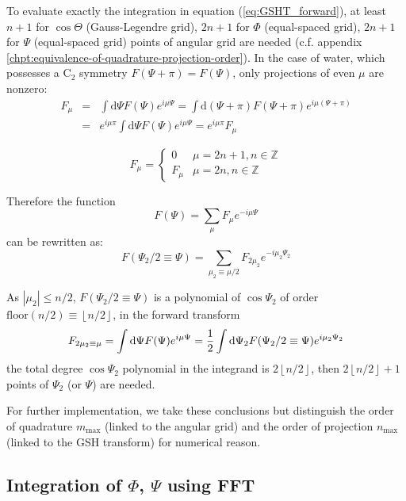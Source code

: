 To evaluate exactly the integration in equation (\ref{eq:GSHT_forward}),
at least $n+1$ for $\cos\Theta$ (Gauss-Legendre grid), $2n+1$ for
$\Phi$ (equal-spaced grid), $2n+1$ for $\Psi$ (equal-spaced grid)
points of angular grid are needed (c.f. appendix \ref{chpt:equivalence-of-quadrature-projection-order}).
In the case of water, which possesses a $\mathrm{C}_{2}$ symmetry
$F(\Psi+\pi)=F(\Psi)$, only projections of even $\mu$ are nonzero:
\begin{eqnarray}
F_{\mu} & = & \int\mathrm{d}\Psi F(\Psi)e^{i\mu\Psi}=\int\mathrm{d}(\Psi+\pi)F(\Psi+\pi)e^{i\mu(\Psi+\pi)}\nonumber \\
 & = & e^{i\mu\pi}\int\mathrm{d}\Psi F(\Psi)e^{i\mu\Psi}=e^{i\mu\pi}F_{\mu}
\end{eqnarray}

\begin{equation}
F_{\mu}=\begin{cases}
0 & \mu=2n+1,n\in\mathbb{Z}\\
F_{\mu} & \mu=2n,n\in\mathbb{Z}
\end{cases}
\end{equation}

Therefore the function
\begin{equation}
F(\Psi)=\sum_{\mu}F_{\mu}e^{-i\mu\Psi}
\end{equation}
can be rewritten as:
\begin{equation}
F(\Psi_{2}/2\equiv\Psi)=\sum_{\mu_{2}\equiv\mu/2}F_{2\mu_{2}}e^{-i\mu_{2}\Psi_{2}}
\end{equation}

As $\left|\mu_{2}\right|\leq n/2$, $F(\Psi_{2}/2\equiv\Psi)$ is
a polynomial of $\cos\Psi_{2}$ of order $\mathrm{floor}(n/2)\equiv\left\lfloor n/2\right\rfloor $,
in the forward transform
\begin{equation}
F_{2\mu_{2}\equiv\mu}=\intop\mathrm{d}\Psi F(\Psi)e^{i\mu\Psi}=\frac{1}{2}\intop\mathrm{d}\Psi_{2}F(\Psi_{2}/2\equiv\Psi)e^{i\mu_{2}\Psi_{2}}
\end{equation}
the total degree $\cos\Psi_{2}$ polynomial in the integrand is $2\left\lfloor n/2\right\rfloor $,
then $2\left\lfloor n/2\right\rfloor +1$ points of $\Psi_{2}$ (or
$\Psi$) are needed. 

For further implementation, we take these conclusions but distinguish
the order of quadrature $m_{\mathrm{max}}$ (linked to the angular
grid) and the order of projection $n_{\mathrm{max}}$ (linked to the
\acs{GSH} transform) for numerical reason.

\subsection{Integration of $\Phi$, $\Psi$ using FFT}

